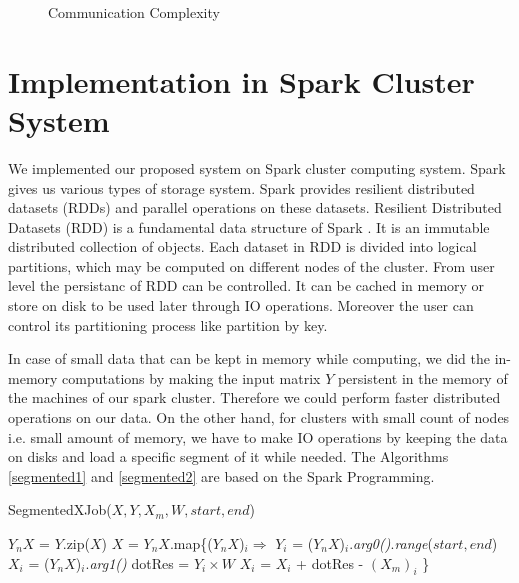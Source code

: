 \documentclass[10pt,conference,letterpaper]{IEEEtran}
\begin{document}
\begin{figure}[!htbp]
    \centering
    \caption{Communication Complexity}
    \label{fig:comm}
\end{figure}



\section{Implementation in Spark Cluster System}
We implemented our proposed system on Spark \cite{spark} cluster computing system. Spark gives us various types of storage system. Spark provides resilient distributed datasets (RDDs) and parallel operations on these datasets. Resilient Distributed Datasets (RDD) is a fundamental data structure of Spark \cite{spark-site}. It is an immutable distributed collection of objects. Each dataset in RDD is divided into logical partitions, which may be computed on different nodes of the cluster. From user level the persistanc of RDD can be controlled. It can be cached in memory or store on disk to be used later through IO operations. Moreover the user can control its partitioning process like partition by key.

In case of small data that can be kept in memory while computing, we did the in-memory computations by making the input matrix $Y$ persistent in the memory of the machines of our spark cluster. Therefore we could perform faster distributed operations on our data. On the other hand, for clusters with small count of nodes i.e. small amount of memory, we have to make IO operations by keeping the data on disks and load a specific segment of it while needed. 
The Algorithms \ref{segmented1} and \ref{segmented2} are based on the Spark Programming. 







\begin{algorithm} [!htbp]
\label{segmented1}
  \caption{SegmentedXJob($X,Y,X_m,W,start,end$)}
  \begin{algorithmic} [1]
	\State $Y_nX$ = $Y$.zip($X$)
	\State $X$ = $Y_nX$.map\{($Y_nX$)$_i \Rightarrow$
	        \State \tab $Y_i$ = ($Y_nX$)$_i$.\textit{arg0()}.\textit{range}($start,end$)
			\State \tab $X_i$ = ($Y_nX$)$_i$.\textit{arg1()}
			\State \tab dotRes = $Y_i \times W$
			\State \tab $X_i$ = $X_i$ + dotRes - $(X_m)_i$
			\State \}
  \end{algorithmic}
\end{algorithm}
\end{document}
